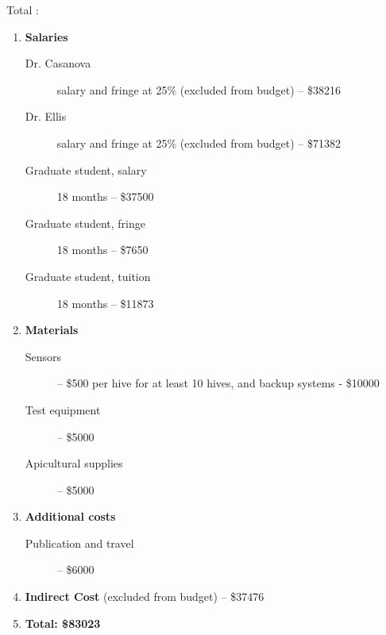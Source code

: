 Total :
\begin{enumerate}
\item \textbf{Salaries}
\begin{description}
\item[Dr. Casanova] salary and fringe at 25\% (excluded from budget) -- \$38216
\item[Dr. Ellis] salary and fringe at 25\%  (excluded from budget)  -- \$71382
\item[Graduate student, salary] 18 months -- \$37500
\item[Graduate student, fringe] 18 months -- \$7650
\item[Graduate student, tuition] 18 months -- \$11873
\end{description}
\item \textbf{Materials}
\begin{description}
\item[Sensors] -- \$500 per hive for at least 10 hives, and backup systems - \$10000 
\item[Test equipment] -- \$5000 
\item[Apicultural supplies] -- \$5000
\end{description}
\item \textbf{Additional costs}
\begin{description}
\item[Publication and travel] -- \$6000
\end{description}
\item \textbf{Indirect Cost} (excluded from budget) -- \$37476
\item \textbf{Total: \$83023} 
\end{enumerate}
